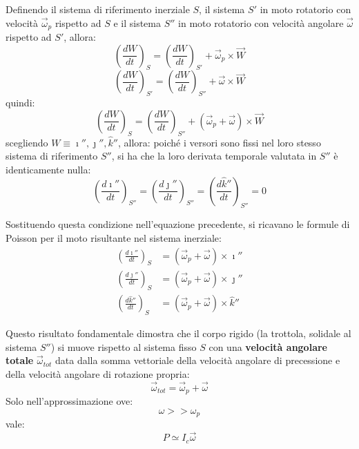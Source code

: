 \documentclass[11pt, a4paper, openright]{book}
\theoremstyle{plain}
\theoremstyle{definition}
\begin{document}
Definendo il sistema di riferimento inerziale $S$, il sistema $S'$ in moto rotatorio con velocità $\vec{\omega}_p$ rispetto ad $S$ e il sistema $S''$ in moto rotatorio con velocità angolare $\vec{\omega}$ rispetto ad $S'$, allora:
\begin{equation}
    \left(\frac{dW}{dt}\right)_S = \left(\frac{dW}{dt}\right)_{S'} + \vec{\omega}_p \times \vec{W}
\end{equation}
\begin{equation}
    \left(\frac{dW}{dt}\right)_{S'} = \left(\frac{dW}{dt}\right)_{S''} + \vec{\omega} \times \vec{W}
\end{equation}
quindi:
\begin{equation}
    \left(\frac{dW}{dt}\right)_S = \left(\frac{dW}{dt}\right)_{S''} + (\vec{\omega}_p + \vec{\omega}) \times \vec{W}
\end{equation}
scegliendo $W \equiv \imath'', \jmath'', \hat{k}''$, allora:
poiché i versori sono fissi nel loro stesso sistema di riferimento $S''$, si ha che la loro derivata temporale valutata in $S''$ è identicamente nulla:
\begin{equation}
    \left(\frac{d\imath''}{dt}\right)_{S''} = \left(\frac{d\jmath''}{dt}\right)_{S''} = \left(\frac{d\hat{k}''}{dt}\right)_{S''} = 0
\end{equation}

Sostituendo questa condizione nell'equazione precedente, si ricavano le formule di Poisson per il moto risultante nel sistema inerziale:
\begin{align}
    \left(\frac{d\imath''}{dt}\right)_S & = (\vec{\omega}_p + \vec{\omega}) \times \imath'' \\
    \left(\frac{d\jmath''}{dt}\right)_S & = (\vec{\omega}_p + \vec{\omega}) \times \jmath'' \\
    \left(\frac{d\hat{k}''}{dt}\right)_S & = (\vec{\omega}_p + \vec{\omega}) \times \hat{k}''
\end{align}

Questo risultato fondamentale dimostra che il corpo rigido (la trottola, solidale al sistema $S''$) si muove rispetto al sistema fisso $S$ con una \textbf{velocità angolare totale} $\vec{\omega}_{tot}$ data dalla somma vettoriale della velocità angolare di precessione e della velocità angolare di rotazione propria:
\begin{equation}
    \vec{\omega}_{tot} = \vec{\omega}_p + \vec{\omega}
\end{equation}
Solo nell'approssimazione ove:
\begin{equation}
    \omega >> \omega_p
\end{equation}
vale:
\begin{equation}
    P \simeq I_c \vec{\omega}
\end{equation}
\end{document}
